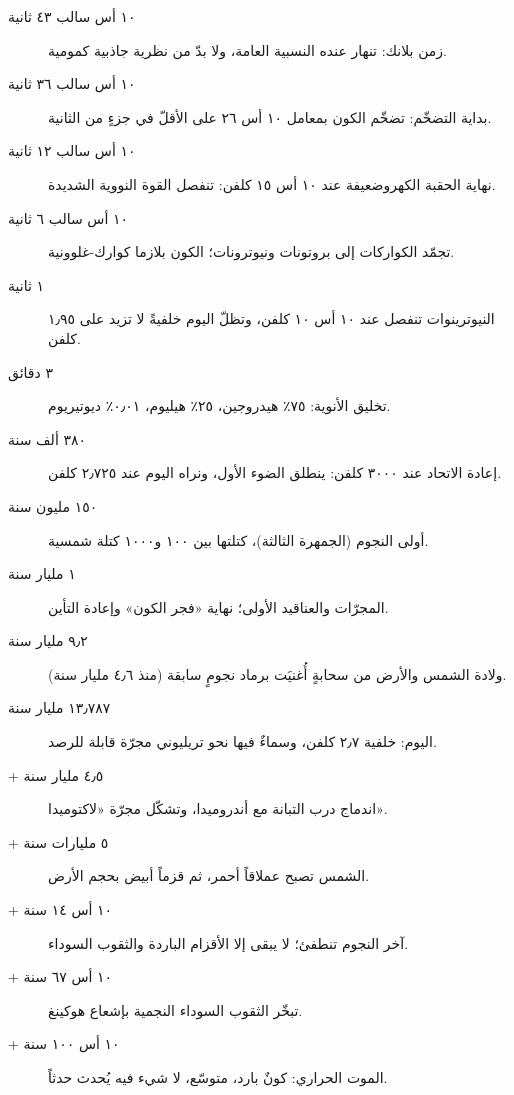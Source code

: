 \documentclass[12pt,a4paper,openany]{book}
\begin{document}
\begin{description}

\item[{١٠ أس سالب ٤٣ ثانية}] زمن بلانك: تنهار عنده النسبية العامة، ولا بدّ من نظرية جاذبية كمومية.

\item[{١٠ أس سالب ٣٦ ثانية}] بداية التضخّم: تضخّم الكون بمعامل ١٠ أس ٢٦ على الأقلّ في جزءٍ من الثانية.

\item[{١٠ أس سالب ١٢ ثانية}] نهاية الحقبة الكهروضعيفة عند ١٠ أس ١٥ كلفن: تنفصل القوة النووية الشديدة.

\item[{١٠ أس سالب ٦ ثانية}] تجمّد الكواركات إلى بروتونات ونيوترونات؛ الكون بلازما كوارك-غلوونية.

\item[{١ ثانية}] النيوترينوات تنفصل عند ١٠ أس ١٠ كلفن، وتظلّ اليوم خلفيةً لا تزيد على ١٫٩٥ كلفن.

\item[{٣ دقائق}] تخليق الأنوية: ٧٥٪ هيدروجين، ٢٥٪ هيليوم، ٠٫٠١٪ ديوتيريوم.

\item[{٣٨٠ ألف سنة}] إعادة الاتحاد عند ٣٠٠٠ كلفن: ينطلق الضوء الأول، ونراه اليوم عند ٢٫٧٢٥ كلفن.

\item[{١٥٠ مليون سنة}] أولى النجوم (الجمهرة الثالثة)، كتلتها بين ١٠٠ و١٠٠٠ كتلة شمسية.

\item[{١ مليار سنة}] المجرّات والعناقيد الأولى؛ نهاية «فجر الكون» وإعادة التأين.

\item[{٩٫٢ مليار سنة}] ولادة الشمس والأرض من سحابةٍ أُغنيَت برماد نجومٍ سابقة (منذ ٤٫٦ مليار سنة).

\item[{١٣٫٧٨٧ مليار سنة}] اليوم: خلفية ٢٫٧ كلفن، وسماءٌ فيها نحو تريليوني مجرّة قابلة للرصد.

\item[{+ ٤٫٥ مليار سنة}] اندماج درب التبانة مع أندروميدا، وتشكّل مجرّة «لاكتوميدا».

\item[{+ ٥ مليارات سنة}] الشمس تصبح عملاقاً أحمر، ثم قزماً أبيض بحجم الأرض.

\item[{+ ١٠ أس ١٤ سنة}] آخر النجوم تنطفئ؛ لا يبقى إلا الأقزام الباردة والثقوب السوداء.

\item[{+ ١٠ أس ٦٧ سنة}] تبخّر الثقوب السوداء النجمية بإشعاع هوكينغ.

\item[{+ ١٠ أس ١٠٠ سنة}] الموت الحراري: كونٌ بارد، متوسّع، لا شيء فيه يُحدث حدثاً.

\end{description}
\end{document}
